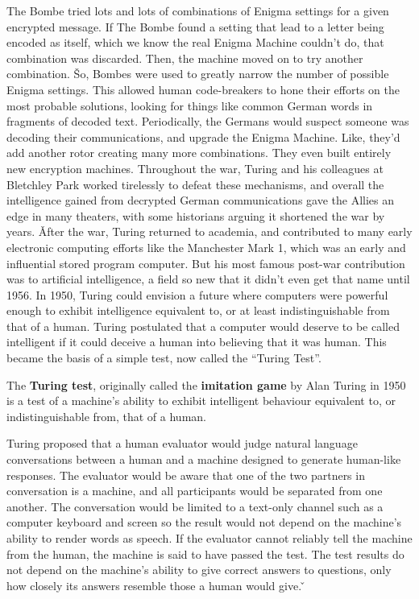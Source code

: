 
The Bombe tried lots and lots of combinations of Enigma settings for a given encrypted message. If The Bombe found a
setting that lead to a letter being encoded as itself, which we know the real Enigma Machine couldn't do, that
combination was discarded. Then, the machine moved on to try another combination. \v

So, Bombes were used to greatly narrow the number of possible Enigma settings. This allowed human code-breakers to
hone their efforts on the most probable solutions, looking for things like common German words in fragments of
decoded text. Periodically, the Germans would suspect someone was decoding their communications, and upgrade the
Enigma Machine. Like, they'd add another rotor creating many more combinations. They even built entirely new
encryption machines. Throughout the war, Turing and his colleagues at Bletchley Park worked tirelessly to defeat
these mechanisms, and overall the intelligence gained from decrypted German communications gave the Allies an edge in
many theaters, with some historians arguing it shortened the war by years. \v

After the war, Turing returned to academia, and contributed to many early electronic computing efforts like the
Manchester Mark 1, which was an early and influential stored program computer. But his most famous post-war
contribution was to artificial intelligence, a field so new that it didn't even get that name until 1956. In 1950,
Turing could envision a future where computers were powerful enough to exhibit intelligence equivalent to, or at
least indistinguishable from that of a human. Turing postulated that a computer would deserve to be called
intelligent if it could deceive a human into believing that it was human. This became the basis of a simple test, now
called the ``Turing Test''.

The \textbf{Turing test}, originally called the \textbf{imitation game} by Alan Turing in 1950 is a test of a
machine's ability to exhibit intelligent behaviour equivalent to, or indistinguishable from, that of a human.
\ed

Turing proposed that a human evaluator would judge natural language conversations between a human and a machine
designed to generate human-like responses. The evaluator would be aware that one of the two partners in conversation
is a machine, and all participants would be separated from one another. The conversation would be limited to a
text-only channel such as a computer keyboard and screen so the result would not depend on the machine's ability to
render words as speech. If the evaluator cannot reliably tell the machine from the human, the machine is said to have
passed the test. The test results do not depend on the machine's ability to give correct answers to questions, only
how closely its answers resemble those a human would give. \v

